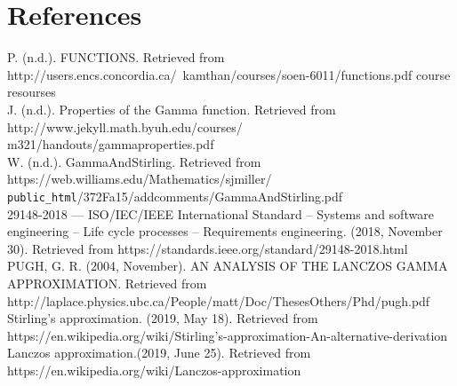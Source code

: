 \documentclass[a4paper, 11pt]{article}
\begin{document}
\pagebreak


\section{References}
\indent\indent
P. (n.d.). FUNCTIONS. Retrieved from http://users.encs.concordia.ca/~kamthan/courses/soen-6011/functions.pdf course resourses\\

J. (n.d.). Properties of the Gamma function. Retrieved from http://www.jekyll.math.byuh.edu/courses/ \\ m321/handouts/gammaproperties.pdf\\

W. (n.d.). GammaAndStirling. Retrieved from https://web.williams.edu/Mathematics/sjmiller/ \\ \texttt{public\_html}/372Fa15/addcomments/GammaAndStirling.pdf \\


29148-2018 --- ISO/IEC/IEEE International Standard -- Systems and software engineering -- Life cycle processes -- Requirements engineering. (2018, November 30). Retrieved from https://standards.ieee.org/standard/29148-2018.html\\

PUGH, G. R. (2004, November). AN ANALYSIS OF THE LANCZOS GAMMA APPROXIMATION. Retrieved from http://laplace.physics.ubc.ca/People/matt/Doc/ThesesOthers/Phd/pugh.pdf \\


Stirling's approximation. (2019, May 18). Retrieved from https://en.wikipedia.org/wiki/Stirling's-approximation-An-alternative-derivation \\


Lanczos approximation.(2019, June 25). Retrieved from https://en.wikipedia.org/wiki/Lanczos-approximation
\end{document}
